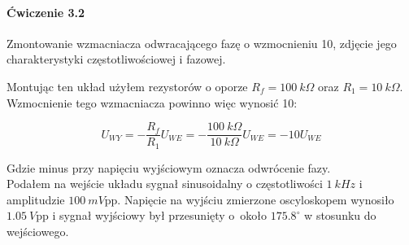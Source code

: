 \documentclass[14pt, table]{extarticle}
\begin{document}
\begin{figure}[H]
    \centering
    \qquad
\end{figure}

\newpage
\paragraph{Ćwiczenie 3.2 \\}
Zmontowanie wzmacniacza odwracającego fazę o wzmocnieniu 10, zdjęcie jego charakterystyki częstotliwościowej i fazowej.

\begin{figure}[H]
    \centering
    \subfloat[\centering ]{{\texttt{[image: C1]}}}%
    \qquad
    \subfloat[\centering ]{{\texttt{[image: C2]}}}%
\end{figure}

Montując ten układ użyłem rezystorów o oporze $R_f = 100 \ k \Omega$ oraz $R_1 = 10 \ k \Omega$. Wzmocnienie tego wzmacniacza powinno więc wynosić 10:

$$ U_{WY} = - \frac{R_f}{R_1} U_{WE} = - \frac{100 \ k \Omega}{10 \ k \Omega} U_{WE} = -10 U_{WE} $$

Gdzie minus przy napięciu wyjściowym oznacza odwrócenie fazy. \\

Podałem na wejście układu sygnał sinusoidalny o częstotliwości $1 \ kHz$ i amplitudzie $100 \ mV$pp. Napięcie na wyjściu zmierzone oscyloskopem wynosiło $1.05 \ V$pp i sygnał wyjściowy był przesunięty o około $175.8^{\circ}$ w stosunku do wejściowego.
\end{document}
